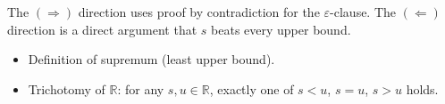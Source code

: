 \begin{remark*}
The $(\Rightarrow)$ direction uses proof by contradiction for the
$\varepsilon$-clause. The $(\Leftarrow)$ direction is a direct argument
that $s$ beats every upper bound.
\end{remark*}

\begin{remark*}[Dependencies]
\begin{itemize}
  \item Definition of supremum (least upper bound).
  \item Trichotomy of $\mathbb{R}$: for any $s, u \in \mathbb{R}$, exactly
        one of $s < u$, $s = u$, $s > u$ holds.
\end{itemize}
\end{remark*}
